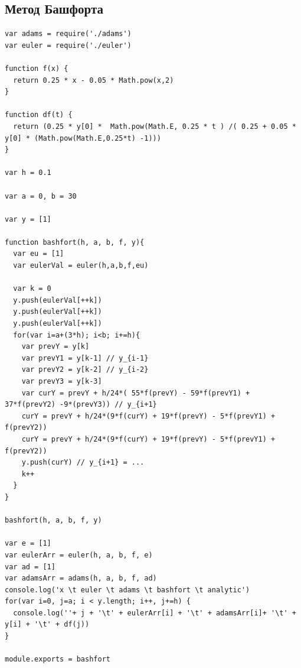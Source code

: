 \documentclass{article}
\begin{document}
\subsection{Метод Башфорта}
\begin{lstlisting}
var adams = require('./adams')
var euler = require('./euler')

function f(x) {
  return 0.25 * x - 0.05 * Math.pow(x,2)
}

function df(t) {
  return (0.25 * y[0] *  Math.pow(Math.E, 0.25 * t ) /( 0.25 + 0.05 * y[0] * (Math.pow(Math.E,0.25*t) -1)))
}

var h = 0.1

var a = 0, b = 30

var y = [1]

function bashfort(h, a, b, f, y){
  var eu = [1]
  var eulerVal = euler(h,a,b,f,eu)
  
  var k = 0
  y.push(eulerVal[++k])
  y.push(eulerVal[++k])
  y.push(eulerVal[++k])
  for(var i=a+(3*h); i<b; i+=h){
    var prevY = y[k]
    var prevY1 = y[k-1] // y_{i-1}
    var prevY2 = y[k-2] // y_{i-2}
    var prevY3 = y[k-3]               
    var curY = prevY + h/24*( 55*f(prevY) - 59*f(prevY1) + 37*f(prevY2) -9*(prevY3)) // y_{i+1}
    curY = prevY + h/24*(9*f(curY) + 19*f(prevY) - 5*f(prevY1) + f(prevY2))
    curY = prevY + h/24*(9*f(curY) + 19*f(prevY) - 5*f(prevY1) + f(prevY2))
    y.push(curY) // y_{i+1} = ...
    k++
  }
}

bashfort(h, a, b, f, y)

var e = [1]
var eulerArr = euler(h, a, b, f, e)
var ad = [1]
var adamsArr = adams(h, a, b, f, ad)
console.log('x \t euler \t adams \t bashfort \t analytic')
for(var i=0, j=a; i < y.length; i++, j+=h) {
  console.log(''+ j + '\t' + eulerArr[i] + '\t' + adamsArr[i]+ '\t' + y[i] + '\t' + df(j))
}

module.exports = bashfort

\end{lstlisting}
\end{document}
